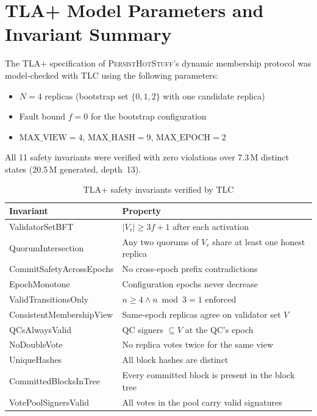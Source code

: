 \documentclass[a4paper,12pt,onecolumn]{report}
\newcommand{\persisthotstuff}{\textsc{PersistHotStuff}}
\begin{document}
\newpage
{}	%









\appendix
\chapter{TLA+ Model Parameters and Invariant Summary}
\label{app:tla}

The TLA+ specification of \persisthotstuff{}'s dynamic membership protocol was
model-checked with TLC using the following parameters:

\begin{itemize}
  \item $N = 4$ replicas (bootstrap set $\{0,1,2\}$ with one candidate replica)
  \item Fault bound $f = 0$ for the bootstrap configuration
  \item $\text{MAX\_VIEW} = 4$, $\text{MAX\_HASH} = 9$, $\text{MAX\_EPOCH} = 2$
\end{itemize}

\noindent All 11 safety invariants were verified with zero violations over
7.3\,M distinct states (20.5\,M generated, depth~13).

\begin{table}[H]
\centering
\caption{TLA+ safety invariants verified by TLC}
\begin{tabular}{lp{9cm}}
\toprule
\textbf{Invariant} & \textbf{Property} \\
\midrule
ValidatorSetBFT            & $|V_r| \ge 3f{+}1$ after each activation \\
QuorumIntersection         & Any two quorums of $V_r$ share at least one honest replica \\
CommitSafetyAcrossEpochs   & No cross-epoch prefix contradictions \\
EpochMonotone              & Configuration epochs never decrease \\
ValidTransitionsOnly       & $n \ge 4 \wedge n \bmod 3 = 1$ enforced \\
ConsistentMembershipView   & Same-epoch replicas agree on validator set $V$ \\
QCsAlwaysValid             & QC signers $\subseteq V$ at the QC's epoch \\
NoDoubleVote               & No replica votes twice for the same view \\
UniqueHashes               & All block hashes are distinct \\
CommittedBlocksInTree      & Every committed block is present in the block tree \\
VotePoolSignersValid       & All votes in the pool carry valid signatures \\
\bottomrule
\end{tabular}
\end{table}
\end{document}
